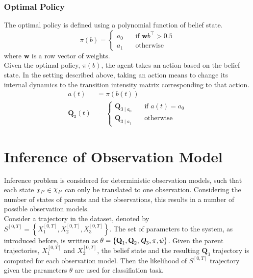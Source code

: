 \subsubsection{Optimal Policy}
The optimal policy is defined using a polynomial function of belief state.
\begin{equation}
\pi(b) = 
\begin{cases}
a_0 & \quad \text{if } \textbf{w}b^\intercal > 0.5 \\
a_1 & \quad \text{otherwise}
\end{cases}
\label{eq:policy}
\end{equation}
where \textbf{w} is a row vector of weights.\\
Given the optimal policy, $ \pi(b) $, the agent takes an action based on the belief state. In the setting described above, taking an action means to change its internal dynamics to the transition intensity matrix corresponding to that action.
\begin{align}
a(t) &= \pi(b(t))\\
\textbf{Q}_3(t) & = \begin{cases}
\textbf{Q}_{3\mid a_{0}} & \quad \text{if } a(t) = a_0 \\
\textbf{Q}_{3\mid a_{1}} & \quad \text{otherwise}
\end{cases}
\label{eq:Q_3_traj}
\end{align}

\section{Inference of Observation Model}
\label{sec:inf_setup}
Inference problem is considered for deterministic observation models, such that each state $ x_P \in \rchi_P $ can only be translated to one observation. Considering the number of states of parents and the observations, this results in a number of possible observation models. \\
Consider a trajectory in the dataset, denoted by $ S^{[0,T]} = \left\lbrace X_1^{[0,T]} , X_2^{[0,T]}, X_3^{[0,T]}\right\rbrace $. The set of parameters to the system, as introduced before, is written as $  \theta = \left\lbrace  \textbf{Q}_{1}, \textbf{Q}_{2}, \textit{\textbf{Q}}_3, \pi, \psi \right\rbrace $. Given the parent trajectories, $ X_1^{[0,T]} $ and $ X_2^{[0,T]} $, the belief state and the resulting $ \textbf{Q}_3 $ trajectory is computed for each observation model. Then the likelihood of $ S^{[0,T]} $ trajectory given the parameters $ \theta $ are used for classifiation task.

